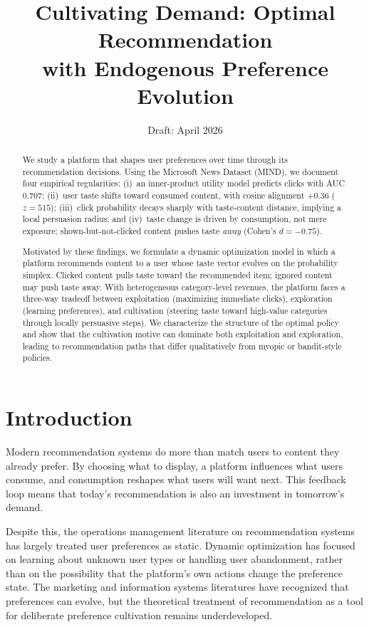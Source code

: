 \documentclass[11pt]{article}
\title{Cultivating Demand: Optimal Recommendation\\with Endogenous Preference Evolution}
\author{}
\date{Draft: April 2026}
\begin{document}
\maketitle

\begin{abstract}
We study a platform that shapes user preferences over time through its recommendation decisions. Using the Microsoft News Dataset (MIND), we document four empirical regularities: (i)~an inner-product utility model predicts clicks with AUC 0.707; (ii)~user taste shifts toward consumed content, with cosine alignment $+0.36$ ($z = 515$); (iii)~click probability decays sharply with taste-content distance, implying a local persuasion radius; and (iv)~taste change is driven by consumption, not mere exposure; shown-but-not-clicked content pushes taste \emph{away} (Cohen's $d = -0.75$).

Motivated by these findings, we formulate a dynamic optimization model in which a platform recommends content to a user whose taste vector evolves on the probability simplex. Clicked content pulls taste toward the recommended item; ignored content may push taste away. With heterogeneous category-level revenues, the platform faces a three-way tradeoff between exploitation (maximizing immediate clicks), exploration (learning preferences), and cultivation (steering taste toward high-value categories through locally persuasive steps). We characterize the structure of the optimal policy and show that the cultivation motive can dominate both exploitation and exploration, leading to recommendation paths that differ qualitatively from myopic or bandit-style policies.
\end{abstract}

\section{Introduction}
\label{sec:intro}

Modern recommendation systems do more than match users to content they already prefer. By choosing what to display, a platform influences what users consume, and consumption reshapes what users will want next. This feedback loop means that today's recommendation is also an investment in tomorrow's demand.

Despite this, the operations management literature on recommendation systems has largely treated user preferences as static. Dynamic optimization has focused on learning about unknown user types or handling user abandonment, rather than on the possibility that the platform's own actions change the preference state. The marketing and information systems literatures have recognized that preferences can evolve, but the theoretical treatment of recommendation as a tool for deliberate preference cultivation remains underdeveloped.
\end{document}
